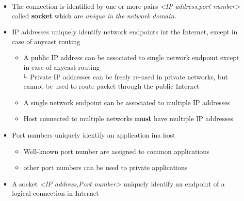\begin{itemize}
\item The connection is identified by one or more pairs \textit{<IP address,port number>} called \textbf{socket} which are \emph{unique in the network domain}.
\item IP addresses uniquely identify network endpoints int the Internet, except in case of anycast routing
	\begin{itemize}
	\item A public IP address can be associated to  single network endpoint except in case of anycast routing\\$\curarr$
Private IP addresses can be freely re-used in private networks, but cannot be used to route packet through the public Internet    
    \item A single network endpoint can be associated to multiple IP addresses
    \item Host connected to multiple networks \textbf{must} have multiple IP addresses
	\end{itemize}
\item Port numbers uniquely identify an application ina host
\begin{itemize}
\item Well-known port number are assigned to common applications
\item other port numbers can be used to private applications
\end{itemize}
\item A socket \textit{<IP address,Port number>} uniquely identify an endpoint of a logical connection in Internet 
\end{itemize}


